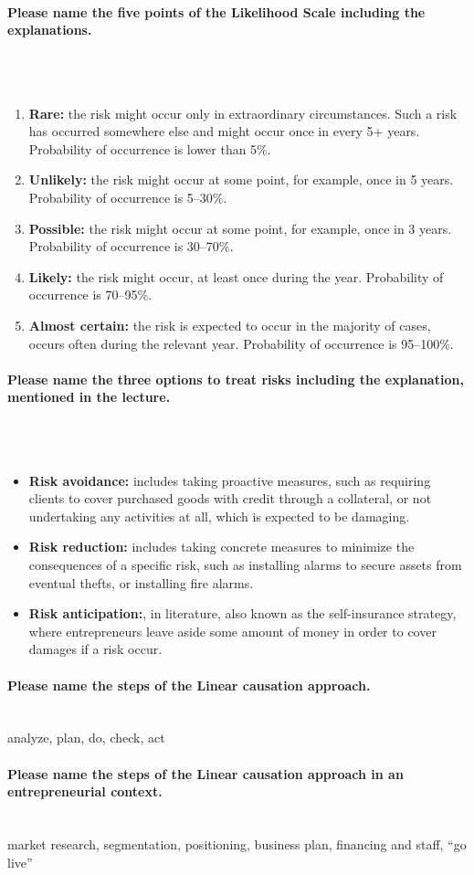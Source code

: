 \documentclass[10pt,a4paper,noendnumber=true]{scrartcl}
\newcommand{\properparagraph}[1]{\paragraph{\textcolor{Emerald}{#1}}\mbox{}\\}
\begin{document}
\properparagraph{Please name the five points of the Likelihood Scale including the explanations.}
\\[-6ex]
\begin{enumerate}
	\item  \textbf{Rare:} the risk might occur only in extraordinary circumstances. Such a
	risk has occurred somewhere else and might occur once in every 5+ years.
	Probability of occurrence is lower than 5\%.
	\item  \textbf{Unlikely:} the risk might occur at some point, for example, once in 5
	years. Probability of occurrence is 5–30\%.
	\item  \textbf{Possible:} the risk might occur at some point, for example, once in 3
	years. Probability of occurrence is 30–70\%.
	\item  \textbf{Likely:} the risk might occur, at least once during the year. Probability of
	occurrence is 70–95\%.
	\item  \textbf{Almost certain:} the risk is expected to occur in the majority of cases,	occurs often during the relevant year. Probability of occurrence is 95–100\%.
\end{enumerate}


\properparagraph{Please name the three options to treat risks including the explanation, mentioned in the lecture.}
\\[-6ex]
\begin{itemize}
	\item \textbf{Risk avoidance:} includes taking proactive measures, such as requiring
	clients to cover purchased goods with credit through a collateral, or not
	undertaking any activities at all, which is expected to be damaging.
	\item \textbf{Risk reduction:} includes taking concrete measures to minimize the
	consequences of a specific risk, such as installing alarms to secure
	assets from eventual thefts, or installing fire alarms.
	\item \textbf{Risk anticipation:}, in literature, also known as the self-insurance strategy, where entrepreneurs leave aside some amount of money in order to
	cover damages if a risk occur.
\end{itemize}

\properparagraph{Please name the steps of the Linear causation approach.}
analyze, plan, do, check, act

\properparagraph{Please name the steps of the Linear causation approach in an entrepreneurial context.}
market research, segmentation, positioning, business plan, financing and staff, "`go live"'
\end{document}
